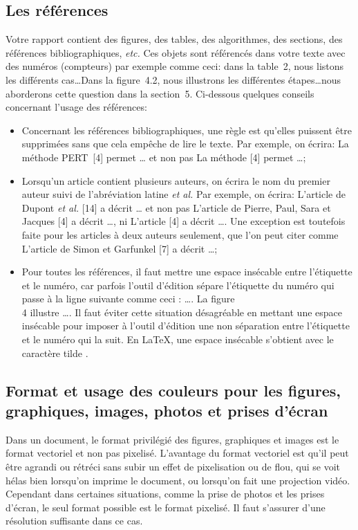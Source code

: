 \documentclass{rapport}
\def\Latex{\LaTeX\xspace}
\def\etc{\textit{etc.}\xspace}
\begin{document}
      \subsection{Les références} 
        Votre rapport contient des figures, des tables, des algorithmes, des sections, des références bibliographiques, \etc Ces objets sont référencés dans votre texte avec des numéros (compteurs) par exemple comme ceci: \og{}  dans la table~2, nous listons les différents cas\dots Dans la figure~4.2, nous illustrons les différentes étapes\dots nous aborderons cette question dans la section~5\fg{}. Ci-dessous quelques conseils concernant l'usage des références:
        \begin{itemize}
          \item Concernant les références bibliographiques, une règle est qu'elles puissent être supprimées sans que cela empêche de lire le texte. Par exemple, on écrira: \og{} La méthode PERT~[4] permet \dots \fg{}  et non pas \og{} La méthode [4] permet \dots\fg{}; 
          \item Lorsqu'un article contient plusieurs auteurs, on écrira le nom du premier auteur suivi de l'abréviation latine {\it et al.} Par exemple, on écrira: \og{} L'article de Dupont {\it et al.} [14] a décrit \dots \fg{}  et non pas \og{} L'article de Pierre, Paul, Sara et Jacques [4] a décrit \dots\fg{}, ni \og{} L'article [4] a décrit \dots\fg{}.  Une exception est toutefois faite pour les articles à deux auteurs seulement, que l'on peut citer comme  \og{} L'article de Simon et Garfunkel [7] a décrit \dots\fg{};
          \item Pour toutes les références, il faut mettre une espace insécable entre l'étiquette et le numéro, car parfois l'outil d'édition sépare l'étiquette du numéro qui passe à la ligne suivante comme ceci : \hfill\og{} \dots. La figure \\
            4 illustre \dots \fg{}. Il faut éviter cette situation désagréable en mettant une espace insécable pour imposer à l'outil d'édition une non séparation entre l'étiquette et le numéro qui la suit. En \Latex, une espace insécable s'obtient avec le caractère tilde \raisebox{0.75ex}{\texttildelow}.
        \end{itemize}
      
      \subsection{Format et usage des couleurs pour les figures, graphiques,  images, photos et prises d'écran} 
        Dans un document, le format privilégié des figures, graphiques et images est le format vectoriel et non pas pixelisé. L'avantage du format vectoriel est qu'il peut être agrandi ou rétréci sans subir un effet de pixelisation ou de flou, qui se voit hélas bien lorsqu'on imprime le document, ou lorsqu'on fait une projection vidéo. Cependant dans certaines situations, comme la prise de photos et les prises d'écran, le seul format possible est le format pixelisé. Il faut s'assurer d'une résolution suffisante dans ce cas.
        
\end{document}
